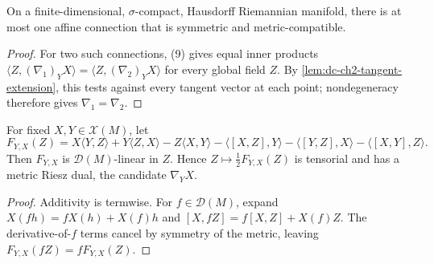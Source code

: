 \begin{lemma}
  \label{lem:dc-ch2-3-6-unique}
  \leanok
  On a finite-dimensional, $\sigma$-compact, Hausdorff Riemannian manifold,
  there is at most one affine connection that is symmetric and
  metric-compatible.
\end{lemma}
\begin{proof}
  \leanok
  \sketch
  For two such connections, (9) gives equal inner products
  $\langle Z,(\nabla_1)_YX\rangle=\langle Z,(\nabla_2)_YX\rangle$ for every
  global field $Z$. By \cref{lem:dc-ch2-tangent-extension}, this tests against
  every tangent vector at each point; nondegeneracy therefore gives
  $\nabla_1=\nabla_2$.
\end{proof}

\begin{lemma}
  \label{lem:dc-ch2-3-6-welldef}
  \leanok
  For fixed $X,Y\in\mathcal{X}(M)$, let
  \[
    F_{Y,X}(Z)
      =X\langle Y,Z\rangle+Y\langle Z,X\rangle-Z\langle X,Y\rangle
       -\langle[X,Z],Y\rangle-\langle[Y,Z],X\rangle
       -\langle[X,Y],Z\rangle.
  \]
  Then $F_{Y,X}$ is $\mathcal{D}(M)$-linear in $Z$. Hence
  $Z\mapsto\frac12F_{Y,X}(Z)$ is tensorial and has a metric Riesz dual, the
  candidate $\nabla_YX$.
\end{lemma}
\begin{proof}
  \leanok
  \sketch
  Additivity is termwise. For $f\in\mathcal{D}(M)$, expand
  $X(fh)=fX(h)+X(f)h$ and
  $[X,fZ]=f[X,Z]+X(f)Z$. The derivative-of-$f$ terms cancel by symmetry of the
  metric, leaving $F_{Y,X}(fZ)=fF_{Y,X}(Z)$.
\end{proof}

